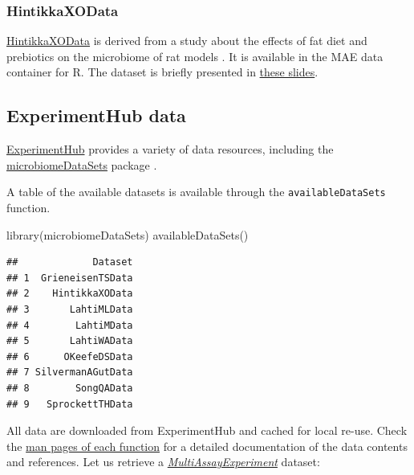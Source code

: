 \documentclass[
]{book}
\newenvironment{Shaded}{\begin{snugshade}}{\end{snugshade}}
\newcommand{\FunctionTok}[1]{\textcolor[rgb]{0.00,0.00,0.00}{#1}}
\newcommand{\NormalTok}[1]{#1}
\begin{document}
\hypertarget{hintikka-desc}{%
\subsubsection{HintikkaXOData}\label{hintikka-desc}}

\href{https://microbiome.github.io/microbiomeDataSets/reference/HintikkaXOData.html}{HintikkaXOData}
is derived from a study about the effects of fat diet and prebiotics on the
microbiome of rat models \citep{Hintikka2021}. It is available in the MAE data
container for R. The dataset is briefly presented in
\href{https://microbiome.github.io/outreach/hintikkaxo_presentation.html}{these slides}.

\hypertarget{experimenthub-data}{%
\subsection{ExperimentHub data}\label{experimenthub-data}}

\href{https://bioconductor.org/packages/release/bioc/vignettes/ExperimentHub/inst/doc/ExperimentHub.html}{ExperimentHub}
provides a variety of data resources, including the
\href{https://bioconductor.org/packages/release/data/experiment/html/microbiomeDataSets.html}{microbiomeDataSets}
package \citep{Morgan2021, microlahti2021}.

A table of the available datasets is available through the
\texttt{availableDataSets} function.

\begin{Shaded}
\begin{Highlighting}[]
\FunctionTok{library}\NormalTok{(microbiomeDataSets)}
\FunctionTok{availableDataSets}\NormalTok{()}
\end{Highlighting}
\end{Shaded}

\begin{verbatim}
##             Dataset
## 1  GrieneisenTSData
## 2    HintikkaXOData
## 3       LahtiMLData
## 4        LahtiMData
## 5       LahtiWAData
## 6      OKeefeDSData
## 7 SilvermanAGutData
## 8        SongQAData
## 9   SprockettTHData
\end{verbatim}

All data are downloaded from ExperimentHub and cached for local
re-use. Check the \href{https://microbiome.github.io/microbiomeDataSets/reference/index.html}{man pages of each
function}
for a detailed documentation of the data contents and references. Let
us retrieve a \emph{\href{https://bioconductor.org/packages/3.17/MultiAssayExperiment}{MultiAssayExperiment}} dataset:
\end{document}
